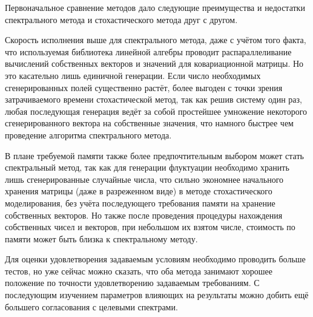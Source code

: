 
Первоначальное сравнение методов дало следующие преимущества и недостатки спектрального метода и стохастического метода друг с другом.

Скорость исполнения выше для спектрального метода, даже с учётом того факта, что используемая библиотека линейной алгебры проводит распараллеливание вычислений собственных векторов и значений для ковариационной матрицы. Но это касательно лишь единичной генерации. Если число необходимых сгенерированных полей существенно растёт, более выгоден с точки зрения затрачиваемого времени стохастической метод, так как решив систему один раз, любая последующая генерация ведёт за собой простейшее умножение некоторого сгенерированного вектора на собственные значения, что намного быстрее чем проведение алгоритма спектрального метода.

В плане требуемой памяти также более предпочтительным выбором может стать спектральный метод, так как для генерации флуктуации необходимо хранить лишь сгенерированные случайные числа, что сильно экономнее начального хранения матрицы (даже в разреженном виде) в методе стохастического моделирования, без учёта последующего требования памяти на хранение собственных векторов. Но также после проведения процедуры нахождения собственных чисел и векторов, при небольшом их взятом числе, стоимость по памяти может быть близка к спектральному методу.

Для оценки удовлетворения задаваемым условиям необходимо проводить больше тестов, но уже сейчас можно сказать, что оба метода занимают хорошее положение по точности удовлетворению задаваемым требованиям. С последующим изучением параметров влияющих на результаты можно добить ещё большего согласования с целевыми спектрами.
